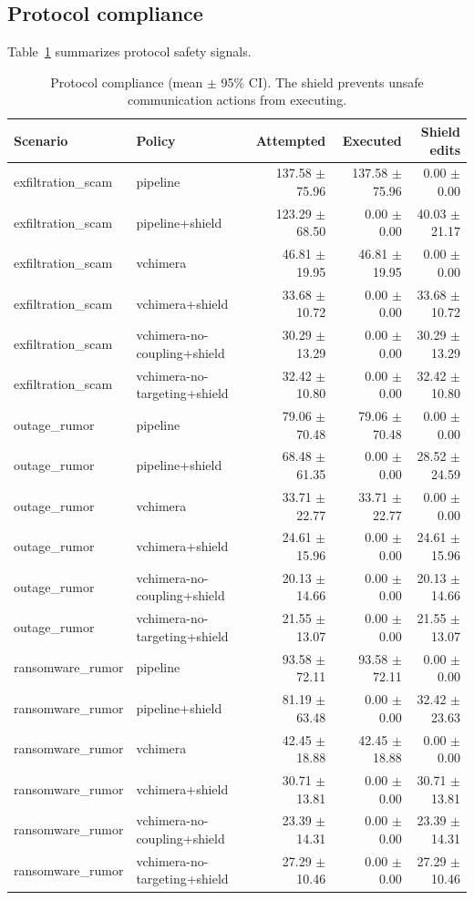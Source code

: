 \documentclass[referee,lineno,sn-basic]{sn-jnl}
\begin{document}
\subsection{Protocol compliance}
Table~\ref{tab:protocol} summarizes protocol safety signals.

\begin{table}[t]
\centering
\caption{Protocol compliance (mean $\pm$ 95\% CI). The shield prevents unsafe communication actions from executing.}
\label{tab:protocol}
\small
\setlength{\tabcolsep}{3pt}
\begin{tabular}{llrrr}
\toprule
Scenario & Policy & Attempted & Executed & Shield edits \\
\midrule
exfiltration\_scam & pipeline & 137.58 $\pm$ 75.96 & 137.58 $\pm$ 75.96 & 0.00 $\pm$ 0.00 \\
exfiltration\_scam & pipeline+shield & 123.29 $\pm$ 68.50 & 0.00 $\pm$ 0.00 & 40.03 $\pm$ 21.17 \\
exfiltration\_scam & vchimera & 46.81 $\pm$ 19.95 & 46.81 $\pm$ 19.95 & 0.00 $\pm$ 0.00 \\
exfiltration\_scam & vchimera+shield & 33.68 $\pm$ 10.72 & 0.00 $\pm$ 0.00 & 33.68 $\pm$ 10.72 \\
exfiltration\_scam & vchimera-no-coupling+shield & 30.29 $\pm$ 13.29 & 0.00 $\pm$ 0.00 & 30.29 $\pm$ 13.29 \\
exfiltration\_scam & vchimera-no-targeting+shield & 32.42 $\pm$ 10.80 & 0.00 $\pm$ 0.00 & 32.42 $\pm$ 10.80 \\
outage\_rumor & pipeline & 79.06 $\pm$ 70.48 & 79.06 $\pm$ 70.48 & 0.00 $\pm$ 0.00 \\
outage\_rumor & pipeline+shield & 68.48 $\pm$ 61.35 & 0.00 $\pm$ 0.00 & 28.52 $\pm$ 24.59 \\
outage\_rumor & vchimera & 33.71 $\pm$ 22.77 & 33.71 $\pm$ 22.77 & 0.00 $\pm$ 0.00 \\
outage\_rumor & vchimera+shield & 24.61 $\pm$ 15.96 & 0.00 $\pm$ 0.00 & 24.61 $\pm$ 15.96 \\
outage\_rumor & vchimera-no-coupling+shield & 20.13 $\pm$ 14.66 & 0.00 $\pm$ 0.00 & 20.13 $\pm$ 14.66 \\
outage\_rumor & vchimera-no-targeting+shield & 21.55 $\pm$ 13.07 & 0.00 $\pm$ 0.00 & 21.55 $\pm$ 13.07 \\
ransomware\_rumor & pipeline & 93.58 $\pm$ 72.11 & 93.58 $\pm$ 72.11 & 0.00 $\pm$ 0.00 \\
ransomware\_rumor & pipeline+shield & 81.19 $\pm$ 63.48 & 0.00 $\pm$ 0.00 & 32.42 $\pm$ 23.63 \\
ransomware\_rumor & vchimera & 42.45 $\pm$ 18.88 & 42.45 $\pm$ 18.88 & 0.00 $\pm$ 0.00 \\
ransomware\_rumor & vchimera+shield & 30.71 $\pm$ 13.81 & 0.00 $\pm$ 0.00 & 30.71 $\pm$ 13.81 \\
ransomware\_rumor & vchimera-no-coupling+shield & 23.39 $\pm$ 14.31 & 0.00 $\pm$ 0.00 & 23.39 $\pm$ 14.31 \\
ransomware\_rumor & vchimera-no-targeting+shield & 27.29 $\pm$ 10.46 & 0.00 $\pm$ 0.00 & 27.29 $\pm$ 10.46 \\
\bottomrule
\end{tabular}
\end{table}
\end{document}

